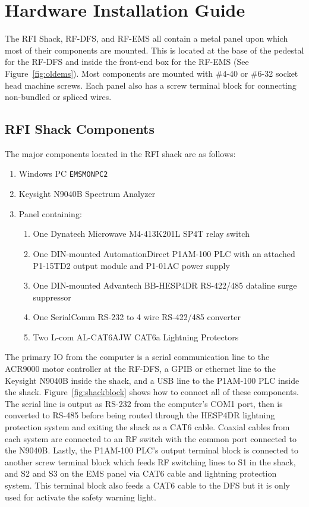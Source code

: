 \documentclass[titlepage]{article}
\begin{document}
\section{Hardware Installation Guide}\label{sec:hig}
The RFI Shack, RF-DFS, and RF-EMS all contain a metal panel upon which most of their components are mounted. This is located at the base of the pedestal for the RF-DFS and inside the front-end box for the RF-EMS (See Figure~\ref{fig:oldems}). Most components are mounted with \#4-40 or \#6-32 socket head machine screws. Each panel also has a screw terminal block for connecting non-bundled or spliced wires.

\subsection{RFI Shack Components}\label{sec:higshack}
The major components located in the RFI shack are as follows:
\begin{enumerate}
  \item Windows PC \verb|EMSMONPC2|
  \item Keysight N9040B Spectrum Analyzer
  \item Panel containing:
  \begin{enumerate}
    \item One Dynatech Microwave M4-413K201L SP4T relay switch
    \item One DIN-mounted AutomationDirect P1AM-100 PLC with an attached P1-15TD2 output module and P1-01AC power supply
    \item One DIN-mounted Advantech BB-HESP4DR RS-422/485 dataline surge suppressor
    \item One SerialComm RS-232 to 4 wire RS-422/485 converter
    \item Two L-com AL-CAT6AJW CAT6a Lightning Protectors
  \end{enumerate}
\end{enumerate}

The primary IO from the computer is a serial communication line to the ACR9000 motor controller at the RF-DFS, a GPIB or ethernet line to the Keysight N9040B inside the shack, and a USB line to the P1AM-100 PLC inside the shack. Figure~\ref{fig:shackblock} shows how to connect all of these components. The serial line is output as RS-232 from the computer's COM1 port, then is converted to RS-485 before being routed through the HESP4DR lightning protection system and exiting the shack as a CAT6 cable. Coaxial cables from each system are connected to an RF switch with the common port connected to the N9040B. Lastly, the P1AM-100 PLC's output terminal block is connected to another screw terminal block which feeds RF switching lines to S1 in the shack, and S2 and S3 on the EMS panel via CAT6 cable and lightning protection system. This terminal block also feeds a CAT6 cable to the DFS but it is only used for activate the safety warning light.
\end{document}
